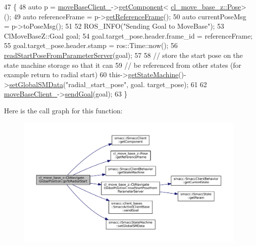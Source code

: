 \begin{DoxyCode}
47 \{
48     \textcolor{keyword}{auto} p = \hyperlink{classcl__move__base__z_1_1CbNavigateGlobalPosition_a460d6b43834cb52baa94d22cd3a6fd2b}{moveBaseClient\_}->\hyperlink{classsmacc_1_1ISmaccClient_adef78db601749ca63c19e74a27cb88cc}{getComponent}<
      \hyperlink{classcl__move__base__z_1_1Pose}{cl\_move\_base\_z::Pose}>();
49     \textcolor{keyword}{auto} referenceFrame = p->\hyperlink{classcl__move__base__z_1_1Pose_af8c2dc151e74aa8da6b283d1c8563051}{getReferenceFrame}();
50     \textcolor{keyword}{auto} currentPoseMsg = p->toPoseMsg();
51 
52     ROS\_INFO(\textcolor{stringliteral}{"Sending Goal to MoveBase"});
53     ClMoveBaseZ::Goal goal;
54     goal.target\_pose.header.frame\_id = referenceFrame;
55     goal.target\_pose.header.stamp = ros::Time::now();
56     \hyperlink{classcl__move__base__z_1_1CbNavigateGlobalPosition_a868b25f238e3781c9a2e44b4e1502fcc}{readStartPoseFromParameterServer}(goal);
57 
58     \textcolor{comment}{// store the start pose on the state machine storage so that it can}
59     \textcolor{comment}{// be referenced from other states (for example return to radial start)}
60     this->\hyperlink{classsmacc_1_1SmaccClientBehavior_aa817da149f366f6a28794c04eb0744b0}{getStateMachine}()->\hyperlink{classsmacc_1_1ISmaccStateMachine_a8588f9e580fbb95b53e2bd2ca3ff1f98}{setGlobalSMData}(\textcolor{stringliteral}{"radial\_start\_pose"}, goal.
      target\_pose);
61 
62     \hyperlink{classcl__move__base__z_1_1CbNavigateGlobalPosition_a460d6b43834cb52baa94d22cd3a6fd2b}{moveBaseClient\_}->\hyperlink{classsmacc_1_1client__bases_1_1SmaccActionClientBase_a9c47a5094ac8afb01680307fe5eca922}{sendGoal}(goal);
63 \}
\end{DoxyCode}
Here is the call graph for this function\+:
\nopagebreak
\begin{figure}[H]
\begin{center}
\leavevmode
\includegraphics[width=350pt]{classcl__move__base__z_1_1CbNavigateGlobalPosition_a489aaab9282dea9253fcf6b02e5f8aa4_cgraph}
\end{center}
\end{figure}
